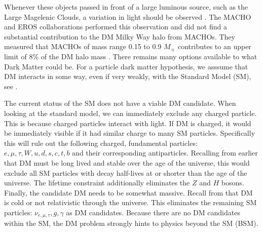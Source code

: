 Whenever these objects passed in front of a large luminous source, such as the Large Magelenic Clouds, a variation in light should be observed \cite{Hooper:DMHistory}.
The MACHO and EROS collaborations performed this observation and did not find a substantial contribution to the DM Milky Way halo from MACHOs.
They measured that MACHOs of mass range 0.15 to 0.9 $M_{\sun}$ contributes to an upper limit of 8\% of the DM halo mass \cite{Tisserand:MACHO}.
There remains many options available to what Dark Matter could be.
For a particle dark matter hypothesis, we asssume that DM interacts in some way, even if very weakly, with the Standard Model (SM), see .
\begin{figure}[ht]
    \label{fig:SM}
\end{figure}
The current status of the SM does not have a viable DM candidate.
When looking at the standard model, we can immediately exclude any charged particle.
This is because charged particles interact with light.
If DM is charged, it would be immediately visible if it had similar charge to many SM particles.
Specifically this will rule out the following charged, fundamental particles: $e,\mu, \tau, W, u, d, s, c, t, b$ and their corresponding antiparticles.
Recalling from earlier that DM must be long lived and stable over the age of the universe, this would exclude all SM particles with decay half-lives at or shorter than the age of the universe.
The lifetime constraint additionally eliminates the $Z$ and $H$ bosons.
Finally, the candidate DM needs to be somewhat massive.
Recall from  that DM is cold or not relativistic through the universe.
This eliminates the remaining SM particles: $\nu_{e, \mu, \tau}, g, \gamma$ as DM candidates.
Because there are no DM candidates within the SM, the DM problem strongly hints to physics beyond the SM (BSM).


